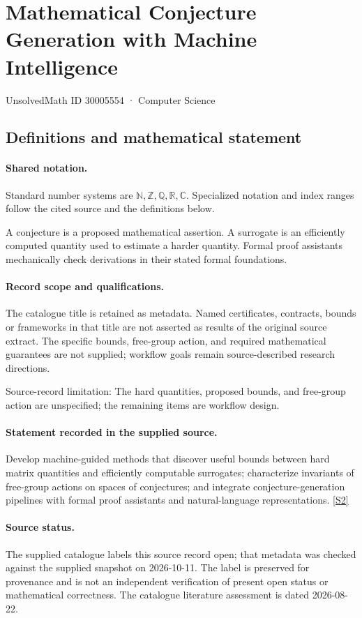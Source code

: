 \documentclass[11pt]{article}
\newcommand{\sref}[2]{\hyperlink{source:#1:#2}{[S#2]}}
\begin{document}
\setcounter{section}{30005553}
\section{Mathematical Conjecture Generation with Machine Intelligence}\label{30005554}
{\small\sffamily UnsolvedMath ID 30005554 · Computer Science}
\subsection{Definitions and mathematical statement}

\paragraph{Shared notation.}Standard number systems are $\mathbb N,\mathbb Z,\mathbb Q,\mathbb R,\mathbb C$. Specialized notation and index ranges follow the cited source and the definitions below.


A conjecture is a proposed mathematical assertion. A surrogate is an efficiently computed quantity used to estimate a harder quantity. Formal proof assistants mechanically check derivations in their stated formal foundations.
\paragraph{Record scope and qualifications.}
The catalogue title is retained as metadata. Named certificates, contracts, bounds or frameworks in that title are not asserted as results of the original source extract.
The specific bounds, free-group action, and required mathematical guarantees are not supplied; workflow goals remain source-described research directions.

Source-record limitation: The hard quantities, proposed bounds, and free-group action are unspecified; the remaining items are workflow design.
\paragraph{Statement recorded in the supplied source.}
Develop machine-guided methods that discover useful bounds between hard matrix quantities and efficiently computable surrogates; characterize invariants of free-group actions on spaces of conjectures; and integrate conjecture-generation pipelines with formal proof assistants and natural-language representations. \sref{30005554}{2}
\paragraph{Source status.}
The supplied catalogue labels this source record open; that metadata was checked against the supplied snapshot on 2026-10-11. The label is preserved for provenance and is not an independent verification of present open status or mathematical correctness. The catalogue literature assessment is dated 2026-08-22.
\end{document}
